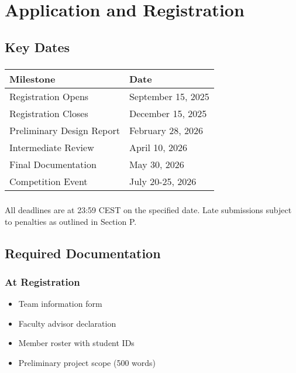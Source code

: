 
\renewcommand{\thesection}{AR}
\section{Application and Registration}

\subsection{Key Dates}

\subsubsection{}

\begin{tabular}{ll}
\toprule
Milestone & Date \\
\midrule
Registration Opens & September 15, 2025 \\
Registration Closes & December 15, 2025 \\
Preliminary Design Report & February 28, 2026 \\
Intermediate Review & April 10, 2026 \\
Final Documentation & May 30, 2026 \\
Competition Event & July 20-25, 2026 \\
\bottomrule
\end{tabular}

\subsubsection{}
All deadlines are at 23:59 CEST on the specified date. Late submissions subject to penalties as outlined in Section P.

\subsection{Required Documentation}

\subsubsection{At Registration}
\begin{itemize}[noitemsep]
    \item Team information form
    \item Faculty advisor declaration
    \item Member roster with student IDs
    \item Preliminary project scope (500 words)
\end{itemize}

